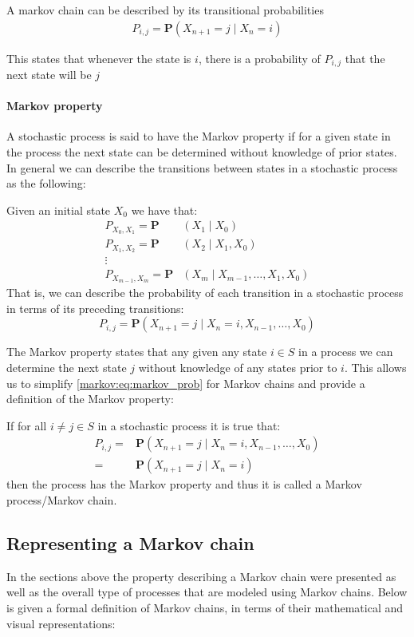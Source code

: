 A markov chain can be described by its transitional probabilities \begin{align}
P_{i,j} = \mathbf{P} (X_{n+1} = j\mid X_n = i)
\end{align}

This states that whenever the state is $ i $, there is a probability of $ P_{i,j}  $ that the next state will be $ j $

\paragraph{Markov property}\label{markov:property}
A stochastic process is said to have the Markov property if for a given state in the process the next state can be determined without knowledge of prior states.
In general we can describe the transitions between states in a stochastic process as the following:

Given an initial state $X_0$ we have that:
\begin{align*}
P_{X_0,X_1} = \mathbf{P}&(X_1 \mid X_0)\\
P_{X_1,X_2} = \mathbf{P}&(X_2 \mid X_1, X_0)\\
\vdots\\
P_{X_{m-1},X_m} = \mathbf{P}&(X_m \mid X_{m-1}, \dots, X_1, X_0)
\end{align*}
That is, we can describe the probability of each transition in a stochastic process in terms of its preceding transitions:
\begin{equation}\label{markov:eq:stochastic_prob}
P_{i,j} = \mathbf{P}(X_{n+1} = j \mid X_n = i, X_{n-1}, \dots, X_0)
\end{equation}

The Markov property states that any given any state $i \in S$ in a process we can determine the next state $j$ without knowledge of any states prior to $i$.
This allows us to simplify \cref{markov:eq:markov_prob} for Markov chains and provide a definition of the Markov property:

If for all $i \neq j \in S$ in a stochastic process it is true that:
\begin{align}\label{markov:eq:markov_prob}
P_{i,j} = &\mathbf{P}(X_{n+1} = j \mid X_n = i, X_{n-1}, \dots, X_0) \nonumber\\
        = &\mathbf{P}(X_{n+1} = j \mid X_n = i)
\end{align}
then the process has the Markov property and thus it is called a Markov process/Markov chain.

\subsection{Representing a Markov chain}
In the sections above the property describing a Markov chain were presented as well as the overall type of processes that are modeled using Markov chains.
Below is given a formal definition of Markov chains, in terms of their mathematical and visual representations:

